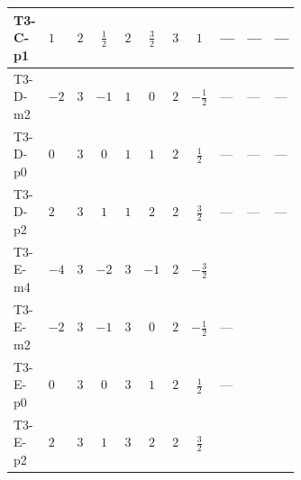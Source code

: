 \documentclass[8pt]{article}
\begin{document}
\begin{landscape}
\begin{longtable}{@{}llcccccc >{\raggedright\arraybackslash}p{0.21\linewidth} >{\raggedright\arraybackslash}p{0.21\linewidth} >{\raggedright\arraybackslash}p{0.21\linewidth}@{}}
T3-C-p1 & $1$ & $2$ & $\frac{1}{2}$ & $2$ & $\frac{3}{2}$ & $3$ & $1$ & --- & --- & --- \\
\midrule
T3-D-m2 & $-2$ & $3$ & $-1$ & $1$ & $0$ & $2$ & $-\frac{1}{2}$ & --- & --- & --- \\
\midrule
T3-D-p0 & $0$ & $3$ & $0$ & $1$ & $1$ & $2$ & $\frac{1}{2}$ & --- & --- & --- \\
\midrule
T3-D-p2 & $2$ & $3$ & $1$ & $1$ & $2$ & $2$ & $\frac{3}{2}$ & --- & --- & --- \\
\midrule
T3-E-m4 & $-4$ & $3$ & $-2$ & $3$ & $-1$ & $2$ & $-\frac{3}{2}$ & \scriptsize\adjustbox{max width=\linewidth}{$\begin{gathered} +12 {g_1}^4\end{gathered}$} & \scriptsize\adjustbox{max width=\linewidth}{$\begin{gathered} +{g_1}^2 \left(-\frac{15 {\lambda_{12}^{(1)}}}{2}-30 {\lambda_{12}^{(\times)}}\right)\end{gathered}$} & \scriptsize\adjustbox{max width=\linewidth}{$\begin{gathered} +{\lambda_{12}^{(1)}}^2\end{gathered}$} \\
\midrule
T3-E-m2 & $-2$ & $3$ & $-1$ & $3$ & $0$ & $2$ & $-\frac{1}{2}$ & --- & \scriptsize\adjustbox{max width=\linewidth}{$\begin{gathered} +{g_1}^2 \left(-\frac{3 {\lambda_{12}^{(1)}}}{2}-6 {\lambda_{12}^{(\times)}}\right)\end{gathered}$} & \scriptsize\adjustbox{max width=\linewidth}{$\begin{gathered} +{\lambda_{12}^{(1)}}^2\end{gathered}$} \\
\midrule
T3-E-p0 & $0$ & $3$ & $0$ & $3$ & $1$ & $2$ & $\frac{1}{2}$ & --- & \scriptsize\adjustbox{max width=\linewidth}{$\begin{gathered} +{g_1}^2 \left(-\frac{3 {\lambda_{12}^{(1)}}}{2}-6 {\lambda_{12}^{(\times)}}\right)\end{gathered}$} & \scriptsize\adjustbox{max width=\linewidth}{$\begin{gathered} +{\lambda_{12}^{(1)}}^2\end{gathered}$} \\
\midrule
T3-E-p2 & $2$ & $3$ & $1$ & $3$ & $2$ & $2$ & $\frac{3}{2}$ & \scriptsize\adjustbox{max width=\linewidth}{$\begin{gathered} +12 {g_1}^4\end{gathered}$} & \scriptsize\adjustbox{max width=\linewidth}{$\begin{gathered} +{g_1}^2 \left(-\frac{15 {\lambda_{12}^{(1)}}}{2}-30 {\lambda_{12}^{(\times)}}\right)\end{gathered}$} & \scriptsize\adjustbox{max width=\linewidth}{$\begin{gathered} +{\lambda_{12}^{(1)}}^2\end{gathered}$} \\

\end{longtable}
\end{landscape}
\end{document}
